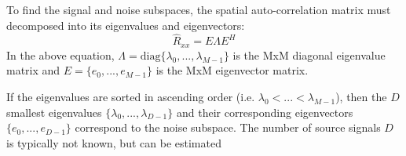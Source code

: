 \documentclass[conference]{IEEEtran}
\begin{document}
		To find the signal and noise subspaces, the spatial auto-correlation matrix must decomposed into its eigenvalues and eigenvectors:
	\begin{equation}
		\hat{R}_{xx} = E{\Lambda}E^H
	\end{equation}
	In the above equation, $\Lambda = \text{diag}\{\lambda_0,...,\lambda_{M-1}\}$ is the MxM diagonal eigenvalue matrix and $E=\{e_0,...,e_{M-1}\}$ is the MxM eigenvector matrix.
	
	If the eigenvalues are sorted in ascending order (i.e. $\lambda_0 < ... < \lambda_{M-1}$), then the $D$ smallest eigenvalues $\{\lambda_0,...,\lambda_{D-1}\}$ and their corresponding eigenvectors $\{e_0,...,e_{D-1}\}$ correspond to the noise subspace. The number of source signals $D$ is typically not known, but can be estimated
	
	
	
\end{document}
